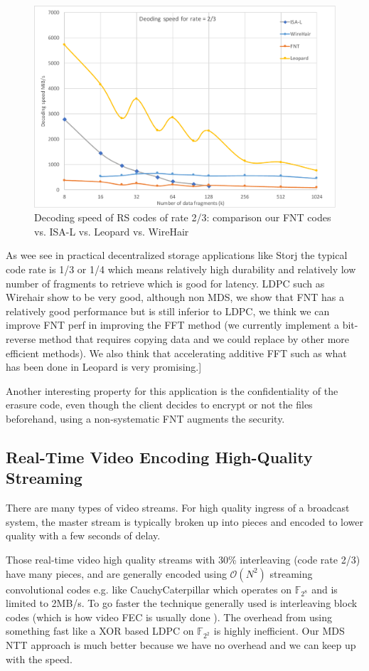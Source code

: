 \documentclass[oneside,9pt]{article}
\newcommand{\bigo}[1]{ \mathcal{O}(#1) }
\newcommand{\gf}[2][]{ \mathbb{F}_{{#2}^{#1}} }
\begin{document}
\begin{figure}[!ht]
\centering
\includegraphics[width=0.7\columnwidth]{Dec_Rate2-3.pdf}
\caption{Decoding speed of RS codes of rate 2/3: comparison our FNT codes vs. ISA-L vs. Leopard vs. WireHair}
\label{fig:comp_dec_rate_2_3}
\end{figure}

As wee see in practical decentralized storage applications like Storj the typical code rate is 1/3 or 1/4 which means relatively high durability and relatively low number of fragments to retrieve which is good for latency. LDPC such as Wirehair show to be very good, although non MDS, we show that FNT has a relatively good performance but is still inferior to LDPC, we think we can improve FNT perf in improving the FFT method (we currently implement a bit-reverse method that requires copying data and we could replace by other more efficient methods). We also think that accelerating additive FFT such as what has been done in Leopard \cite{leopard} is very promising.]

Another interesting property for this application is the confidentiality of the erasure code, even though the client decides to encrypt or not the files beforehand, using a non-systematic FNT augments the security.

\subsection{Real-Time Video Encoding High-Quality Streaming}

There are many types of video streams. For high quality ingress of a broadcast system, the master stream is typically broken up into pieces and encoded to lower quality with a few seconds of delay.

Those real-time video high quality streams with 30\% interleaving (code rate 2/3) have many pieces, and are generally encoded using $\bigo{N^2}$ streaming convolutional codes e.g. like CauchyCaterpillar \cite{cauchycaterpillar} which operates on  $\gf{2^8}$ and is limited to 2MB/s. To go faster the technique generally used is interleaving block codes (which is how video FEC is usually done \cite{al_fec}). The overhead from using something fast like a XOR based LDPC on $\gf{2^2}$ is highly inefficient. Our MDS NTT approach is much better because we have no overhead and we can keep up with the speed.
\end{document}
